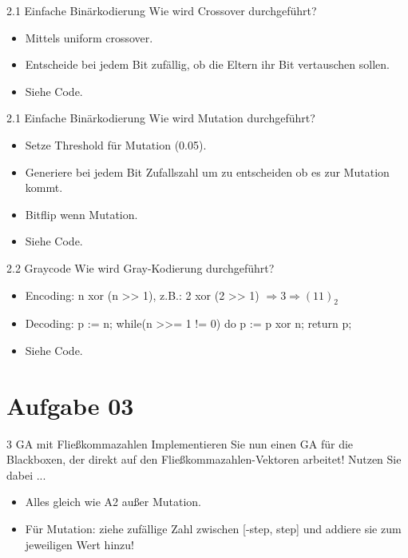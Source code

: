 \documentclass{ocbeameruni}
\begin{document}
\begin{frame}{2.1 Einfache Binärkodierung}
Wie wird Crossover durchgeführt? 
    \begin{itemize}
    \item Mittels uniform crossover.
    \item Entscheide bei jedem Bit zufällig, ob die Eltern ihr Bit vertauschen sollen.
    \item Siehe Code.
    \end{itemize}
\end{frame}

\begin{frame}{2.1 Einfache Binärkodierung}
Wie wird Mutation durchgeführt? 
    \begin{itemize}
    \item Setze Threshold für Mutation (0.05).
    \item Generiere bei jedem Bit Zufallszahl um zu entscheiden ob es zur Mutation kommt.
    \item Bitflip wenn Mutation.
    \item Siehe Code.
    \end{itemize}
\end{frame}

\begin{frame}{2.2 Graycode}
Wie wird Gray-Kodierung durchgeführt? 
    \begin{itemize}
    \item Encoding: n xor (n >> 1), z.B.: 2 xor (2 >> 1) $\Rightarrow 3 \Rightarrow (11)_2$
    \item Decoding: p := n; while(n >>= 1 != 0) do p := p xor n; return p;
    \item Siehe Code.
    \end{itemize}
\end{frame}


\section{Aufgabe 03}

\begin{frame}{3 GA mit Fließkommazahlen}
Implementieren Sie nun einen GA für die Blackboxen, der direkt auf den Fließkommazahlen-Vektoren
arbeitet! Nutzen Sie dabei ...
    \begin{itemize}
    \item Alles gleich wie A2 außer Mutation.
    \item Für Mutation: ziehe zufällige Zahl zwischen [-step, step] und addiere sie zum jeweiligen Wert hinzu!
    \end{itemize}
\end{frame}
\end{document}
